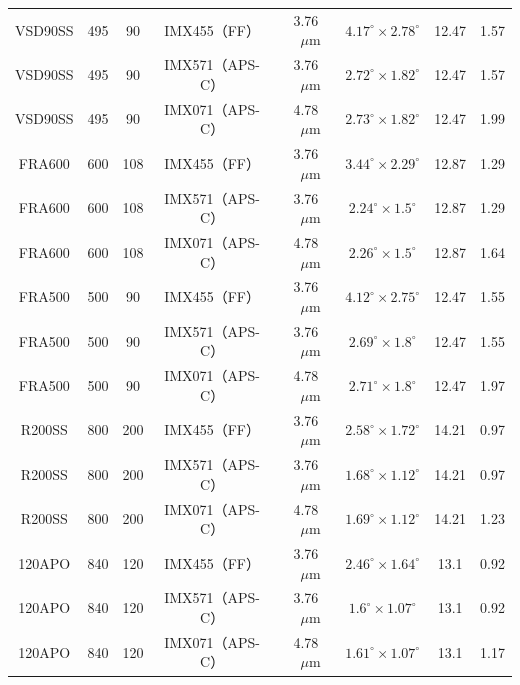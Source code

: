 {\begin{tabular}{ c | c | c | c | c | c | c | c}
        \hline
        VSD90SS & 495 & 90 & IMX455（FF） & 3.76\(\text{ }\mu\text{m}\) & \(4.17^\circ\times2.78^\circ\) & 12.47 &  1.57 \\
        VSD90SS & 495 & 90 & IMX571（APS-C） & 3.76\(\text{ }\mu\text{m}\) & \(2.72^\circ\times1.82^\circ\) & 12.47 &  1.57 \\
        VSD90SS & 495 & 90 & IMX071（APS-C） & 4.78\(\text{ }\mu\text{m}\) & \(2.73^\circ\times1.82^\circ\) & 12.47 &  1.99 \\
        \hline
        FRA600 & 600 & 108 & IMX455（FF） & 3.76\(\text{ }\mu\text{m}\) & \(3.44^\circ\times2.29^\circ\) & 12.87 &  1.29 \\
        FRA600 & 600 & 108 & IMX571（APS-C） & 3.76\(\text{ }\mu\text{m}\) & \(2.24^\circ\times1.5^\circ\) & 12.87 &  1.29 \\
        FRA600 & 600 & 108 & IMX071（APS-C） & 4.78\(\text{ }\mu\text{m}\) & \(2.26^\circ\times1.5^\circ\) & 12.87 &  1.64 \\
        \hline
        FRA500 & 500 & 90 & IMX455（FF） & 3.76\(\text{ }\mu\text{m}\) & \(4.12^\circ\times2.75^\circ\) & 12.47 &  1.55 \\
        FRA500 & 500 & 90 & IMX571（APS-C） & 3.76\(\text{ }\mu\text{m}\) & \(2.69^\circ\times1.8^\circ\) & 12.47 &  1.55 \\
        FRA500 & 500 & 90 & IMX071（APS-C） & 4.78\(\text{ }\mu\text{m}\) & \(2.71^\circ\times1.8^\circ\) & 12.47 &  1.97 \\
        \hline
        R200SS & 800 & 200 & IMX455（FF） & 3.76\(\text{ }\mu\text{m}\) & \(2.58^\circ\times1.72^\circ\) & 14.21 &  0.97 \\
        R200SS & 800 & 200 & IMX571（APS-C） & 3.76\(\text{ }\mu\text{m}\) & \(1.68^\circ\times1.12^\circ\) & 14.21 &  0.97 \\
        R200SS & 800 & 200 & IMX071（APS-C） & 4.78\(\text{ }\mu\text{m}\) & \(1.69^\circ\times1.12^\circ\) & 14.21 &  1.23 \\
        \hline
        120APO & 840 & 120 & IMX455（FF） & 3.76\(\text{ }\mu\text{m}\) & \(2.46^\circ\times1.64^\circ\) & 13.1 &  0.92 \\
        120APO & 840 & 120 & IMX571（APS-C） & 3.76\(\text{ }\mu\text{m}\) & \(1.6^\circ\times1.07^\circ\) & 13.1 &  0.92 \\
        120APO & 840 & 120 & IMX071（APS-C） & 4.78\(\text{ }\mu\text{m}\) & \(1.61^\circ\times1.07^\circ\) & 13.1 &  1.17 \\
        
    \end{tabular}\par
}
